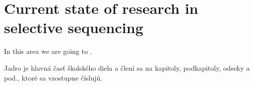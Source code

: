 \chapter{Current state of research in selective sequencing}

\label{kap:selSeqState} %

In this area we are going to  \cite[článok 5]{smernica}.

Jadro je hlavná časť školského diela a člení sa na kapitoly,
podkapitoly, odseky a pod., ktoré sa vzostupne číslujú.
